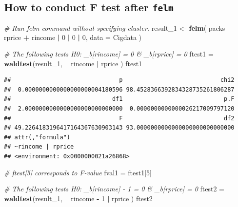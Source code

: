 \documentclass[]{book}
\newenvironment{Shaded}{\begin{snugshade}}{\end{snugshade}}
\newcommand{\KeywordTok}[1]{\textcolor[rgb]{0.13,0.29,0.53}{\textbf{#1}}}
\newcommand{\DataTypeTok}[1]{\textcolor[rgb]{0.13,0.29,0.53}{#1}}
\newcommand{\DecValTok}[1]{\textcolor[rgb]{0.00,0.00,0.81}{#1}}
\newcommand{\StringTok}[1]{\textcolor[rgb]{0.31,0.60,0.02}{#1}}
\newcommand{\CommentTok}[1]{\textcolor[rgb]{0.56,0.35,0.01}{\textit{#1}}}
\newcommand{\OperatorTok}[1]{\textcolor[rgb]{0.81,0.36,0.00}{\textbf{#1}}}
\newcommand{\NormalTok}[1]{#1}
\begin{document}
\subsection{\texorpdfstring{How to conduct F test after
\texttt{felm}}{How to conduct F test after felm}}\label{how-to-conduct-f-test-after-felm}

\begin{Shaded}
\begin{Highlighting}[]
\CommentTok{# Run felm command without specifying cluster.}
\NormalTok{result_}\DecValTok{1}\NormalTok{ <-}\StringTok{ }\KeywordTok{felm}\NormalTok{( packs }\OperatorTok{~}\StringTok{ }\NormalTok{rprice }\OperatorTok{+}\StringTok{ }\NormalTok{rincome  }\OperatorTok{|}\StringTok{ }\DecValTok{0} \OperatorTok{|}\StringTok{ }\DecValTok{0} \OperatorTok{|}\StringTok{ }\DecValTok{0}\NormalTok{, }\DataTypeTok{data =}\NormalTok{ Cigdata )}


\CommentTok{# The following tests H0: _b[rincome] = 0 & _b[rprice] = 0 }
\NormalTok{ftest1 =}\StringTok{ }\KeywordTok{waldtest}\NormalTok{(result_}\DecValTok{1}\NormalTok{, }\OperatorTok{~}\StringTok{ }\NormalTok{rincome }\OperatorTok{|}\StringTok{ }\NormalTok{rprice  )}
\NormalTok{ftest1 }
\end{Highlighting}
\end{Shaded}

\begin{verbatim}
##                               p                            chi2 
##  0.0000000000000000000004180596 98.4528366392834328735261806287 
##                             df1                             p.F 
##  2.0000000000000000000000000000  0.0000000000000026217009797120 
##                               F                             df2 
## 49.2264183196417164367630903143 93.0000000000000000000000000000 
## attr(,"formula")
## ~rincome | rprice
## <environment: 0x0000000021a26868>
\end{verbatim}

\begin{Shaded}
\begin{Highlighting}[]
\CommentTok{# ftest[5] corresponds to F-value}
\NormalTok{fval1 =}\StringTok{ }\NormalTok{ftest1[}\DecValTok{5}\NormalTok{]}


\CommentTok{# The following tests H0: _b[rincome] - 1 = 0 & _b[rprice] = 0 }
\NormalTok{ftest2 =}\StringTok{ }\KeywordTok{waldtest}\NormalTok{(result_}\DecValTok{1}\NormalTok{, }\OperatorTok{~}\StringTok{ }\NormalTok{rincome }\OperatorTok{-}\StringTok{ }\DecValTok{1} \OperatorTok{|}\StringTok{ }\NormalTok{rprice  )}
\NormalTok{ftest2 }
\end{Highlighting}
\end{Shaded}
\end{document}

